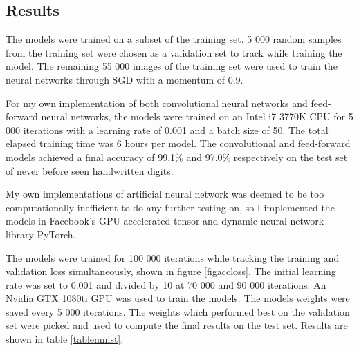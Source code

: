 \documentclass[a4paper, twoside]{article}
\begin{document}
\subsection{Results}
The models were trained on a subset of the training set. 5 000 random samples from the training set were chosen as a validation set to track while training the model. The remaining 55 000 images of the training set were used to train the neural networks through SGD with a momentum \cite{cs231n} of 0.9.

For my own implementation of both convolutional neural networks and feed-forward neural networks, the models were trained on an Intel i7 3770K CPU for 5 000 iterations with a learning rate of 0.001 and a batch size of 50. The total elapsed training time was 6 hours per model. The convolutional and feed-forward models achieved a final accuracy of 99.1\% and 97.0\% respectively on the test set of never before seen handwritten digits. 

My own implementations of artificial neural network was deemed to be too computationally inefficient to do any further testing on, so I implemented the models in Facebook's GPU-accelerated tensor and dynamic neural network library PyTorch.

The models were trained for 100 000 iterations while tracking the training and validation loss simultaneously, shown in figure \ref{figaccloss}. The initial learning rate was set to 0.001 and divided by 10 at 70 000 and 90 000 iterations. An Nvidia GTX 1080ti GPU was used to train the models. The models weights were saved every 5 000 iterations. The weights which performed best on the validation set were picked and used to compute the final results on the test set. Results are shown in table \ref{tablemnist}.
\end{document}
